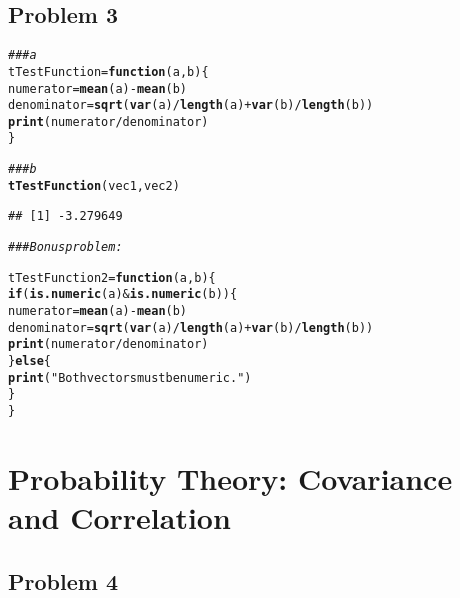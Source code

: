 \documentclass[12pt,letter]{article}\usepackage[]{graphicx}\usepackage[]{color}
\makeatletter
\newcommand{\hlstr}[1]{\textcolor[rgb]{0.192,0.494,0.8}{#1}}%
\newcommand{\hlcom}[1]{\textcolor[rgb]{0.678,0.584,0.686}{\textit{#1}}}%
\newcommand{\hlopt}[1]{\textcolor[rgb]{0,0,0}{#1}}%
\newcommand{\hlstd}[1]{\textcolor[rgb]{0.345,0.345,0.345}{#1}}%
\newcommand{\hlkwa}[1]{\textcolor[rgb]{0.161,0.373,0.58}{\textbf{#1}}}%
\newcommand{\hlkwb}[1]{\textcolor[rgb]{0.69,0.353,0.396}{#1}}%
\newcommand{\hlkwc}[1]{\textcolor[rgb]{0.333,0.667,0.333}{#1}}%
\newcommand{\hlkwd}[1]{\textcolor[rgb]{0.737,0.353,0.396}{\textbf{#1}}}%
\newenvironment{kframe}{%
 \def\at@end@of@kframe{}%
 \ifinner\ifhmode%
  \def\at@end@of@kframe{\end{minipage}}%
  \begin{minipage}{\columnwidth}%
 \fi\fi%
 \def\FrameCommand##1{\hskip\@totalleftmargin \hskip-\fboxsep
 \colorbox{shadecolor}{##1}\hskip-\fboxsep
     \hskip-\linewidth \hskip-\@totalleftmargin \hskip\columnwidth}%
 \MakeFramed {\advance\hsize-\width
   \@totalleftmargin\z@ \linewidth\hsize
   \@setminipage}}%
 {\par\unskip\endMakeFramed%
 \at@end@of@kframe}
\newenvironment{knitrout}{}{} %
\makeatother
\begin{document}
\subsection*{Problem 3}

\begin{knitrout}
\color{fgcolor}\begin{kframe}
\begin{alltt}
\hlcom{### a}
\hlstd{tTestFunction} \hlkwb{=} \hlkwa{function}\hlstd{(}\hlkwc{a}\hlstd{,} \hlkwc{b}\hlstd{) \{}
    \hlstd{numerator} \hlkwb{=} \hlkwd{mean}\hlstd{(a)} \hlopt{-} \hlkwd{mean}\hlstd{(b)}
    \hlstd{denominator} \hlkwb{=} \hlkwd{sqrt}\hlstd{(}\hlkwd{var}\hlstd{(a)}\hlopt{/}\hlkwd{length}\hlstd{(a)} \hlopt{+} \hlkwd{var}\hlstd{(b)}\hlopt{/}\hlkwd{length}\hlstd{(b))}
    \hlkwd{print}\hlstd{(numerator}\hlopt{/}\hlstd{denominator)}
\hlstd{\}}

\hlcom{### b}
\hlkwd{tTestFunction}\hlstd{(vec1, vec2)}
\end{alltt}
\begin{verbatim}
## [1] -3.279649
\end{verbatim}
\begin{alltt}
\hlcom{### Bonus problem:}

\hlstd{tTestFunction2} \hlkwb{=} \hlkwa{function}\hlstd{(}\hlkwc{a}\hlstd{,} \hlkwc{b}\hlstd{) \{}
    \hlkwa{if} \hlstd{(}\hlkwd{is.numeric}\hlstd{(a)} \hlopt{&} \hlkwd{is.numeric}\hlstd{(b)) \{}
        \hlstd{numerator} \hlkwb{=} \hlkwd{mean}\hlstd{(a)} \hlopt{-} \hlkwd{mean}\hlstd{(b)}
        \hlstd{denominator} \hlkwb{=} \hlkwd{sqrt}\hlstd{(}\hlkwd{var}\hlstd{(a)}\hlopt{/}\hlkwd{length}\hlstd{(a)} \hlopt{+} \hlkwd{var}\hlstd{(b)}\hlopt{/}\hlkwd{length}\hlstd{(b))}
        \hlkwd{print}\hlstd{(numerator}\hlopt{/}\hlstd{denominator)}
    \hlstd{\}} \hlkwa{else} \hlstd{\{}
        \hlkwd{print}\hlstd{(}\hlstr{"Both vectors must be numeric."}\hlstd{)}
    \hlstd{\}}
\hlstd{\}}
\end{alltt}
\end{kframe}
\end{knitrout}



\section*{Probability Theory: Covariance and Correlation}

\subsection*{Problem 4}
\end{document}
